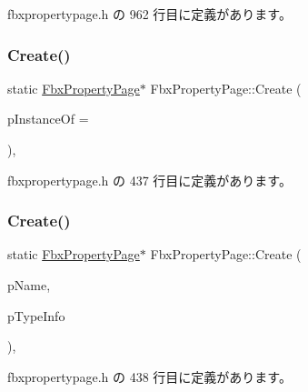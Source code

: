  fbxpropertypage.\+h の 962 行目に定義があります。

\mbox{\label{class_fbx_property_page_ad7b37984a6215b974a58652ac43ffdf9}} 
\subsubsection{\texorpdfstring{Create()}{Create()}\hspace{0.1cm}{\footnotesize\ttfamily [1/3]}}
{\footnotesize\ttfamily static \hyperlink{class_fbx_property_page}{Fbx\+Property\+Page}$\ast$ Fbx\+Property\+Page\+::\+Create (\begin{DoxyParamCaption}\item[{\hyperlink{class_fbx_property_page}{Fbx\+Property\+Page} $\ast$}]{p\+Instance\+Of = {} }\end{DoxyParamCaption})\hspace{0.3cm}{\ttfamily [inline]}, {\ttfamily [static]}}



 fbxpropertypage.\+h の 437 行目に定義があります。

\mbox{\label{class_fbx_property_page_a5b414e6abd7247932caeaf61c7446834}} 
\subsubsection{\texorpdfstring{Create()}{Create()}\hspace{0.1cm}{\footnotesize\ttfamily [2/3]}}
{\footnotesize\ttfamily static \hyperlink{class_fbx_property_page}{Fbx\+Property\+Page}$\ast$ Fbx\+Property\+Page\+::\+Create (\begin{DoxyParamCaption}\item[{const char $\ast$}]{p\+Name,  }\item[{\hyperlink{class_fbx_property_page}{Fbx\+Property\+Page} $\ast$}]{p\+Type\+Info }\end{DoxyParamCaption})\hspace{0.3cm}{\ttfamily [inline]}, {\ttfamily [static]}}



 fbxpropertypage.\+h の 438 行目に定義があります。

